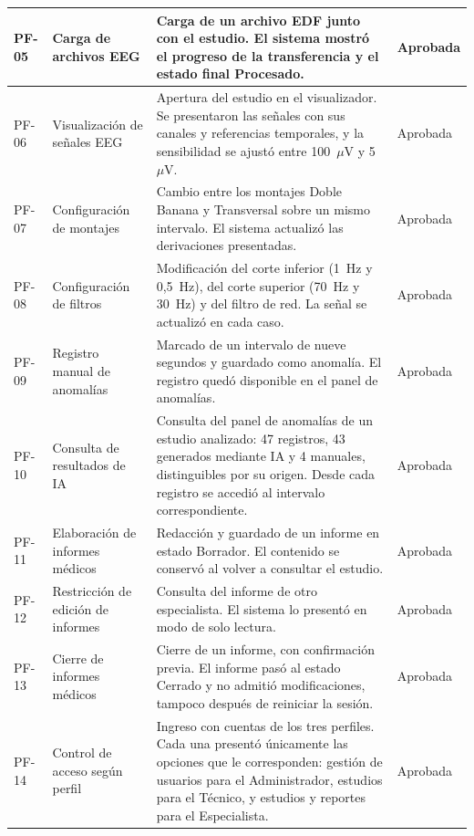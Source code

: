 \begin{nuevotexto}
\begin{longtable}{|p{1.25cm}|p{3.4cm}|p{7.6cm}|p{1.75cm}|}
PF-05 &
Carga de archivos EEG &
Carga de un archivo EDF junto con el estudio. El sistema mostró el progreso de la transferencia y el estado final Procesado. &
Aprobada \\
\hline

PF-06 &
Visualización de señales EEG &
Apertura del estudio en el visualizador. Se presentaron las señales con sus canales y referencias temporales, y la sensibilidad se ajustó entre 100~$\mu$V y 5~$\mu$V. &
Aprobada \\
\hline

PF-07 &
Configuración de montajes &
Cambio entre los montajes Doble Banana y Transversal sobre un mismo intervalo. El sistema actualizó las derivaciones presentadas. &
Aprobada \\
\hline

PF-08 &
Configuración de filtros &
Modificación del corte inferior (1~Hz y 0,5~Hz), del corte superior (70~Hz y 30~Hz) y del filtro de red. La señal se actualizó en cada caso. &
Aprobada \\
\hline

PF-09 &
Registro manual de anomalías &
Marcado de un intervalo de nueve segundos y guardado como anomalía. El registro quedó disponible en el panel de anomalías. &
Aprobada \\
\hline

PF-10 &
Consulta de resultados de IA &
Consulta del panel de anomalías de un estudio analizado: 47 registros, 43 generados mediante IA y 4 manuales, distinguibles por su origen. Desde cada registro se accedió al intervalo correspondiente. &
Aprobada \\
\hline

PF-11 &
Elaboración de informes médicos &
Redacción y guardado de un informe en estado Borrador. El contenido se conservó al volver a consultar el estudio. &
Aprobada \\
\hline

PF-12 &
Restricción de edición de informes &
Consulta del informe de otro especialista. El sistema lo presentó en modo de solo lectura. &
Aprobada \\
\hline

PF-13 &
Cierre de informes médicos &
Cierre de un informe, con confirmación previa. El informe pasó al estado Cerrado y no admitió modificaciones, tampoco después de reiniciar la sesión. &
Aprobada \\
\hline

PF-14 &
Control de acceso según perfil &
Ingreso con cuentas de los tres perfiles. Cada una presentó únicamente las opciones que le corresponden: gestión de usuarios para el Administrador, estudios para el Técnico, y estudios y reportes para el Especialista. &
Aprobada \\
\hline


\end{longtable}
\end{nuevotexto}
